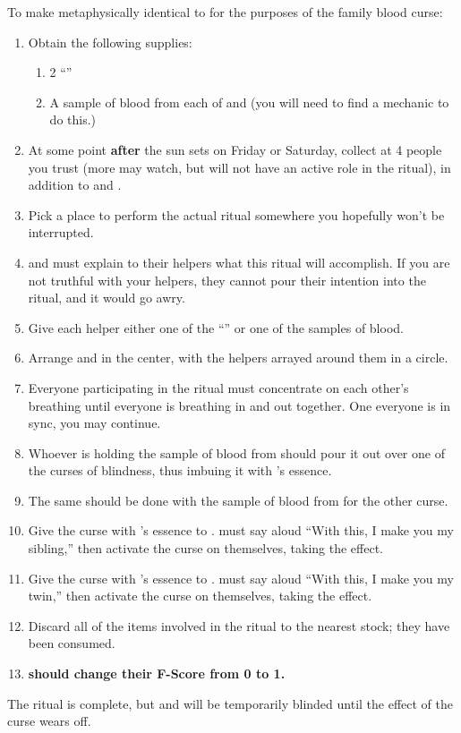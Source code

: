 \documentclass[green]{GL2020}
\begin{document}
To make \cAmbition{} metaphysically identical to \cHeir{} for the purposes of the \cFaledonParent{\Formal} family blood curse:
\begin{enumerate}
  \item Obtain the following supplies:
  \begin{enumerate}
    \item 2 ``\iBlindness{}''
    \item A sample of blood from each of \cHeir{} and \cAmbition{} (you will need to find a mechanic to do this.)
  \end{enumerate}
  \item At some point \textbf{after} the sun sets on Friday or Saturday, collect at 4 people you trust (more may watch, but will not have an active role in the ritual), in addition to \cHeir{} and \cAmbition{}.
  \item Pick a place to perform the actual ritual somewhere you hopefully won’t be interrupted.
  \item \cHeir{} and \cAmbition{} must explain to their helpers what this ritual will accomplish. If you are not truthful with your helpers, they cannot pour their intention into the ritual, and it would go awry.
  \item Give each helper either one of the ``\iBlindness{}'' or one of the samples of blood. %
  \item Arrange \cHeir{} and \Ambitious{} in the center, with the helpers arrayed around them in a circle.
  \item Everyone participating in the ritual must concentrate on each other’s breathing until everyone is breathing in and out together.  One everyone is in sync, you may continue.
  \item Whoever is holding the sample of blood from \cHeir{} should pour it out over one of the curses of blindness, thus imbuing it with \cHeir{}’s essence.
  \item The same should be done with the sample of blood from \cAmbition{} for the other curse.
  \item Give the curse with \cHeir{}’s essence to \cAmbition{}. \cAmbition{} must say aloud ``With this, I make you my sibling,'' then activate the curse on themselves, taking the effect.
  \item Give the curse with \cAmbition{}’s essence to \cHeir{}. \cHeir{} must say aloud ``With this, I make you my twin,'' then activate the curse on themselves, taking the effect.
  \item Discard all of the items involved in the ritual to the nearest stock; they have been consumed.
  \item \textbf{\cAmbition{} should change their F-Score from 0 to 1.}
\end{enumerate}

The ritual is complete, but \cHeir{} and \cAmbition{} will be temporarily blinded until the effect of the curse wears off.
\end{document}
